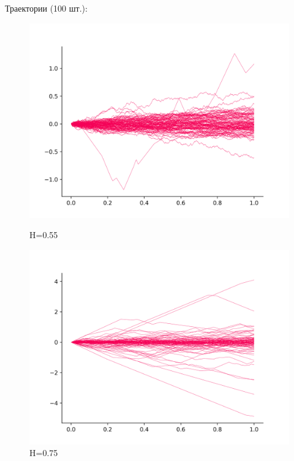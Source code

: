 \documentclass[a4paper,12pt]{article}
\numberwithin{equation}{section}
\begin{document}
	Траектории (100 шт.):
	\begin{figure}[H]
		\includegraphics[scale=0.4]{image-2-55.png}
		\caption{H=0.55}
		\endminipage\hfill
		\includegraphics[scale=0.4]{image-2-75.png}
		\caption{H=0.75}
		\endminipage\hfill
	\end{figure}
	
\end{document}
